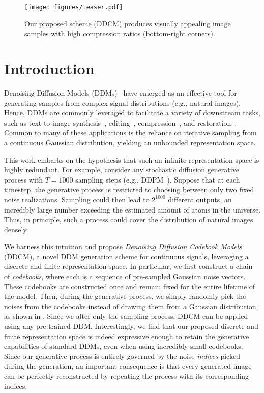 \begin{figure*}[t]
    \centering
    \texttt{[image: figures/teaser.pdf]}
    \caption{Our proposed scheme (DDCM) produces visually appealing image samples with high compression ratios (bottom-right corners).}
    \label{fig:teaser}
\end{figure*}

\section{Introduction}\label{sec:intro}

Denoising Diffusion Models (DDMs)~\citep{sohl2015deep, ho2020denoising} have emerged as an effective tool for generating samples from complex signal distributions (e.g., natural images).
Hence, DDMs are commonly leveraged to facilitate a variety of downstream tasks, such as text-to-image synthesis~\cite{ramesh2021zero,rombach2022high,saharia2022photorealistic},
editing~\citep{meng2022sdedit,huberman2024edit}, compression~\cite{theis2022lossy, elata2024zero, korber2024perco}, and restoration~\citep{kawar2022denoising, chung2023diffusion}. 
Common to many of these applications is the reliance on iterative sampling from a continuous Gaussian distribution, yielding an unbounded representation space.


This work embarks on the hypothesis that such an infinite representation space is highly redundant.
For example, consider any stochastic diffusion generative process with $T=1000$ sampling steps (e.g., DDPM~\citep{ho2020denoising}).
Suppose that at each timestep, the generative process is restricted to choosing between only two fixed noise realizations.
Sampling could then lead to $2^{1000}$ different outputs, an incredibly large number exceeding the estimated amount of atoms in the universe.
Thus, in principle, such a process could cover the distribution of natural images densely.



We harness this intuition and propose \emph{Denoising Diffusion Codebook Models} (DDCM), 
a novel DDM generation scheme for continuous signals, leveraging a discrete and finite representation space. 
In particular, we first construct a chain of \emph{codebooks}, where each is a sequence of pre-sampled Gaussian noise vectors.
These codebooks are constructed once and remain fixed for the entire lifetime of the model.
Then, during the generative process, we simply randomly pick the noises from the codebooks instead of drawing them from a Gaussian distribution, as shown in .
Since we alter only the sampling process, DDCM can be applied using any pre-trained DDM.
Interestingly, we find that our proposed discrete and finite representation space is indeed expressive enough to retain the generative capabilities of standard DDMs, even when using incredibly small codebooks.
Since our generative process is entirely governed by the noise \emph{indices} picked during the generation, an important consequence is that every generated image can be perfectly reconstructed by repeating the process with its corresponding indices.

